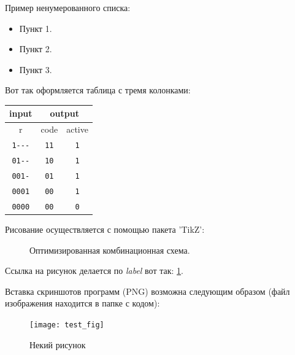 Пример ненумерованного списка:

\begin{itemize}
\item Пункт 1.
\item Пункт 2.
\item Пункт 3.
\end{itemize}

Вот так оформляется таблица с тремя колонками:

\begin{table}[h]
\centering
\begin{tabular}{|c|c|c|}
\hline
input               & \multicolumn{2}{c|}{output} \\ \hline
r                   & code        & active         \\ \hline
\texttt{1{-}{-}{-}} & \texttt{11} & \texttt{1}     \\
\texttt{01{-}{-}}   & \texttt{10} & \texttt{1}     \\
\texttt{001-}       & \texttt{01} & \texttt{1}     \\
\texttt{0001}       & \texttt{00} & \texttt{1}     \\
\texttt{0000}       & \texttt{00} & \texttt{0}     \\
\hline
\end{tabular}
\end{table}

Рисование осуществляется с помощью пакета 'TikZ':

\begin{figure}[ht]
\centering
{}
\caption{Оптимизированная комбинационная схема.}
\label{label_fig_1}
\end{figure}

Ссылка на рисунок делается по \emph{label} вот так: \ref{label_fig_1}.

Вставка скриншотов программ (PNG) возможна следующим образом (файл изображения находится в папке с кодом):

\begin{figure}[h]
\centering
\texttt{[image: test\_fig]}
\caption{Некий рисунок}
\label{test_fig_label}
\end{figure}
